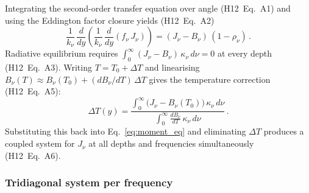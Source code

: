 Integrating the second-order transfer equation over angle (H12~Eq.~A1) and using the Eddington factor closure yields (H12~Eq.~A2)
\begin{equation}
  \frac{1}{k_\nu}\,\frac{d}{dy}\!\left(
    \frac{1}{k_\nu}\,\frac{d}{dy}(f_\nu\,J_\nu)
  \right)
  = (J_\nu - B_\nu)\,(1-\rho_\nu)\,.
  \label{eq:moment_eq}
\end{equation}
Radiative equilibrium requires $\int_0^\infty(J_\nu - B_\nu)\,\kappa_\nu\,d\nu = 0$ at every depth (H12~Eq.~A3). Writing $T = T_0 + \Delta T$ and linearising $B_\nu(T)\approx B_\nu(T_0) + (dB_\nu/dT)\,\Delta T$ gives the temperature correction (H12~Eq.~A5):
\begin{equation}
  \Delta T(y) = \frac{\displaystyle\int_0^\infty
    \bigl(J_\nu - B_\nu(T_0)\bigr)\,\kappa_\nu\,d\nu}
    {\displaystyle\int_0^\infty
    \frac{dB_\nu}{dT}\,\kappa_\nu\,d\nu}\,.
  \label{eq:deltaT}
\end{equation}
Substituting this back into Eq.~\eqref{eq:moment_eq} and eliminating $\Delta T$ produces a coupled system for $J_\nu$ at all depths and frequencies simultaneously (H12~Eq.~A6).

\subsubsection{Tridiagonal system per frequency}

